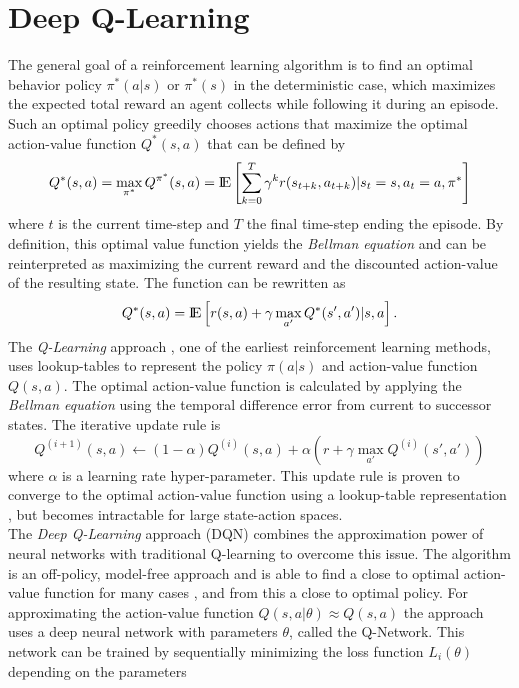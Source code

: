 \section{Deep Q-Learning}
\label{sec:pre}
The general goal of a reinforcement learning algorithm is to find an optimal behavior policy $\pi^*(a|s)$ or $\pi^*(s)$ in the deterministic case, which maximizes the expected total reward an agent collects while following it during an episode. Such an optimal policy greedily chooses actions that maximize the optimal action-value function $Q^*(s,a)$ that can be defined by 
\[ 
Q^*(s,a)=\max_{\pi^*} Q^{\pi^*}(s,a) =  {\rm I\!E} \left[
\sum_{k=0}^{T}\gamma^{k}r(s_{t+k},a_{t+k})|s_t=s,a_t=a,\pi^*\right] 
\]
where $t$ is the current time-step and $T$ the final time-step ending the episode. By definition, this optimal value function yields the \textit{Bellman equation} \citep{sutton2018reinforcement} and can be reinterpreted as maximizing the current reward and the discounted action-value of the resulting state. The function can be rewritten as
\[
Q^*(s,a) = {\rm I\!E} \left[
r(s,a) + \gamma \max_{a'}Q^*(s',a')|s,a \right].
\]
The \textit{Q-Learning} approach \citep{watkins1992q}, one of the earliest reinforcement learning methods, uses lookup-tables to represent the policy $\pi(a|s)$ and action-value function $Q(s,a)$. The optimal action-value function is calculated by applying the \textit{Bellman equation} using the temporal difference error from current to successor states. The iterative update rule is 
\[
Q^{(i+1)}(s,a) \leftarrow (1-\alpha) Q^{(i)}(s,a) + \alpha \left( r + \gamma \max_{a'} Q^{(i)}(s',a') \right)
\]
where $\alpha$ is a learning rate hyper-parameter. This update rule is proven to converge to the optimal action-value function using a lookup-table representation \citep{watkins1992q, jaakkola1994convergence, ribeiro1996q}, but becomes intractable for large state-action spaces. \\
The \textit{Deep Q-Learning} approach (DQN) \citep{mnih2013playing} combines the approximation power of neural networks with traditional Q-learning to overcome this issue. The algorithm is an off-policy, model-free approach and is able to find a close to optimal action-value function for many cases \citep{mnih2015human}, and from this a close to optimal policy. For approximating the action-value function $Q(s,a|\theta)\approx Q(s,a)$ the approach uses a deep neural network with parameters $\theta$, called the Q-Network.
This network can be trained by sequentially minimizing the loss function $L_i(\theta)$ depending on the parameters
